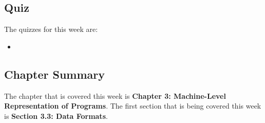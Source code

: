 \subsection{Quiz}

The quizzes for this week are:

\begin{itemize}
    \item {}
\end{itemize}

\newpage

\subsection{Chapter Summary}

The chapter that is covered this week is \textbf{Chapter 3: Machine-Level Representation of Programs}. The first section that is being covered this week is \textbf{Section 3.3: Data Formats}.

